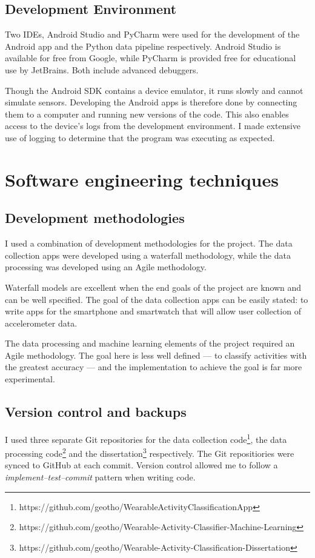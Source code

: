     \subsection{Development Environment}
      Two IDEs, Android Studio and PyCharm were used for the development of the Android app and the Python data pipeline respectively. Android Studio is available for free from Google, while PyCharm is provided free for educational use by JetBrains. Both include advanced debuggers.
      
      Though the Android SDK contains a device emulator, it runs slowly and cannot simulate sensors. Developing the Android apps is therefore done by connecting them to a computer and running new versions of the code. This also enables access to the device's logs from the development environment. I made extensive use of logging to determine that the program was executing as expected.
  \section{Software engineering techniques}
    \subsection{Development methodologies}
      I used a combination of development methodologies for the project. The data collection apps were developed using a waterfall methodology, while the data processing was developed using an Agile methodology.
      
      Waterfall models are excellent when the end goals of the project are known and can be well specified. The goal of the data collection apps can be easily stated: to write apps for the smartphone and smartwatch that will allow user collection of accelerometer data.
      
      The data processing and machine learning elements of the project required an Agile methodology. The goal here is less well defined --- to classify activities with the greatest accuracy --- and the implementation to achieve the goal is far more experimental.
      
    \subsection{Version control and backups}
      I used three separate Git repositories for the data collection code\footnote{https://github.com/geotho/WearableActivityClassificationApp}, the data processing code\footnote{https://github.com/geotho/Wearable-Activity-Classifier-Machine-Learning} and the dissertation\footnote{https://github.com/geotho/Wearable-Activity-Classification-Dissertation} respectively. The Git repositiories were synced to GitHub at each commit. Version control allowed me to follow a \emph{implement--test--commit} pattern when writing code. 
      
